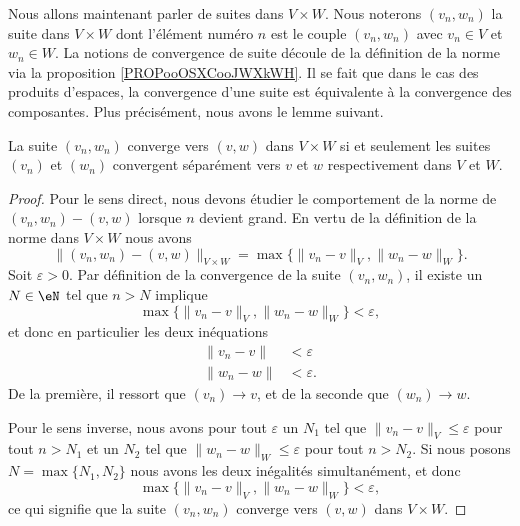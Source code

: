 Nous allons maintenant parler de suites dans $V\times W$. Nous noterons $(v_n,w_n)$ la suite dans $V\times W$ dont l'élément numéro $n$ est le couple $(v_n,w_n)$ avec $v_n\in V$ et $w_n\in W$. La notions de convergence de suite découle de la définition de la norme via la proposition \ref{PROPooOSXCooJWXkWH}. Il se fait que dans le cas des produits d'espaces, la convergence d'une suite est équivalente à la convergence des composantes. Plus précisément, nous avons le lemme suivant.
\begin{lemma}		\label{LemCvVxWcvVW}
	La suite $(v_n,w_n)$ converge vers $(v,w)$ dans $V\times W$ si et seulement les suites $(v_n)$ et $(w_n)$ convergent séparément vers $v$ et $w$ respectivement dans $V$ et $W$.
\end{lemma}

\begin{proof}
	Pour le sens direct, nous devons étudier le comportement de la norme de $(v_n,w_n)-(v,w)$ lorsque $n$ devient grand. En vertu de la définition de la norme dans $V\times W$ nous avons
	\begin{equation}
		\Big\| (v_n,w_n)-(v,w) \Big\|_{V\times W}=\max\big\{ \| v_n-v \|_V,\| w_n-w \|_W \big\}.
	\end{equation}
	Soit $\varepsilon>0$. Par définition de la convergence de la suite $(v_n,w_n)$, il existe un $N\in\eN$ tel que $n>N$ implique
	\begin{equation}
		\max\big\{ \| v_n-v \|_V,\| w_n-w \|_W \big\}<\varepsilon,
	\end{equation}
	et donc en particulier les deux inéquations
	\begin{subequations}
		\begin{align}
			\| v_n-v \|&<\varepsilon\\
			\| w_n-w \|&<\varepsilon.
		\end{align}
	\end{subequations}
	De la première, il ressort que $(v_n)\to v$, et de la seconde que $(w_n)\to w$.

	Pour le sens inverse, nous avons pour tout $\varepsilon$ un $N_1$ tel que $\| v_n-v \|_V\leq\varepsilon$ pour tout $n>N_1$ et un $N_2$ tel que $\| w_n-w \|_W\leq\varepsilon$ pour tout $n>N_2$. Si nous posons $N=\max\{ N_1,N_2 \}$ nous avons les deux inégalités simultanément, et donc
	\begin{equation}
		\max\big\{ \| v_n-v \|_V,\| w_n-w \|_W \big\}<\varepsilon,
	\end{equation}
	ce qui signifie que la suite $(v_n,w_n)$ converge vers $(v,w)$ dans $V\times W$.
\end{proof}

